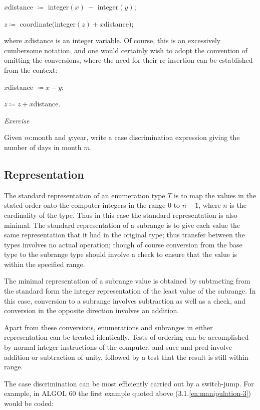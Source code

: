 \begin{enumerate}[wide, nosep, label=(\arabic*)]
	\quad $x$distance $\coloneq$ integer$(x)\ -$ integer$(y)$;
	
	\quad $z \coloneq$ coordinate$($integer$(z) + x$distance$)$;
	
	\noindent
	where $x$distance is an integer variable. Of course, this is an excessively cumbersome notation, and one would certainly wish to adopt the convention of omitting the conversions, where the need for their re-insertion can be established from the context:
	
	$x$distance $\coloneq x - y$;
	
	$z \coloneq z + x$distance.
\end{enumerate}

\noindent
\textit{Exercise}

\noindent
Given $m$:month and $y$:year, write a case discrimination expression giving the number of days in month $m$.

\subsection{Representation}

The standard representation of an enumeration type $T$ is to map the values in the stated order onto the computer integers in the range 0 to $n - 1$, where $n$ is the cardinality of the type. Thus in this case the standard representation is also minimal. The standard representation of a subrange is to give each value the same representation that it had in the original type; thus transfer between the types involves no actual operation; though of course conversion from the base type to the subrange type should involve a check to ensure that the value is within the specified range.

The minimal representation of a subrange value is obtained by subtracting from the standard form the integer representation of the least value of the subrange. In this case, conversion to a subrange involves subtraction as well as a check, and conversion in the opposite direction involves an addition.

Apart from these conversions, enumerations and subranges in either representation can be treated identically. Tests of ordering can be accomplished by normal integer instructions of the computer, and succ and pred involve addition or subtraction of unity, followed by a test that the result is still within range.

The case discrimination can be most efficiently carried out by a switch-jump. For example, in ALGOL 60 the first example quoted above (3.1.\ref{en:manipulation-3}) would be coded:


